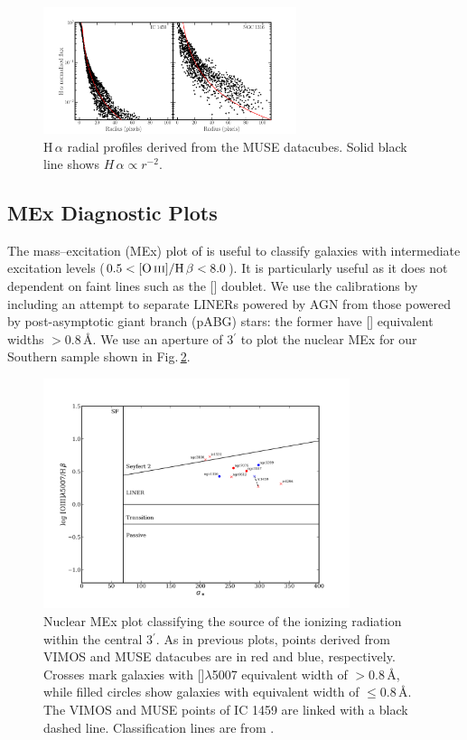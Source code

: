 		\begin{figure}
			\centering
			\includegraphics[width=0.66\textwidth]{chapter5/muse/Halpha_profile.png}
			\caption[MUSE H\,$\alpha$ radial profiles]{H\,$\alpha$ radial profiles derived from the MUSE datacubes. Solid black line shows $H\,\alpha \propto r^{-2}$.} 
			\label{fig:Ha_profile_MUSE}
		\end{figure}


	\subsection{MEx Diagnostic Plots}
		\label{subsec:MEx}
		The mass--excitation (MEx) plot of \citet{Juneau2011} is useful to classify galaxies with intermediate excitation levels ($0.5 < \mathrm{[\ion{O}{iii}]/H\,\beta} < 8.0$). It is particularly useful as it does not dependent on faint lines such as the [] doublet. We use the calibrations by \citet{Nyland2016} including an attempt to separate LINERs powered by AGN from those powered by post-asymptotic giant branch (pABG) stars: the former have [] equivalent widths $>0.8$\,\AA. We use an aperture of 3$^\prime$ to plot the nuclear MEx for our Southern sample shown in Fig.\,\ref{fig:MEx}. 


		\begin{figure}
			\centering
			\includegraphics[width=0.8\textwidth]{chapter5/nuclear_MEx.png}
			\caption[Nuclear mass--excitation plot]{Nuclear MEx plot classifying the source of the ionizing radiation within the central 3$^\prime$. As in previous plots, points derived from VIMOS and MUSE datacubes are in red and blue, respectively. Crosses mark galaxies with []$\lambda$5007 equivalent width of $> 0.8$\,\AA, while filled circles show galaxies with equivalent width of $\leqslant 0.8$\,\AA. The VIMOS and MUSE points of IC 1459 are linked with a black dashed line. Classification lines are from \citet{Nyland2016}.}
			\label{fig:MEx}
		\end{figure}



